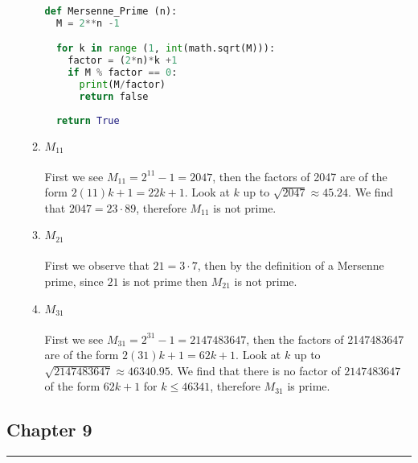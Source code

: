 \documentclass[class=article, crop=false]{standalone}
\begin{document}
\begin{enumerate}
\begin{enumerate}
\begin{center}
\begin{lstlisting}[language=Python]
def Mersenne_Prime (n):
  M = 2**n -1

  for k in range (1, int(math.sqrt(M))):
	factor = (2*n)*k +1
	if M % factor == 0:
	  print(M/factor)
	  return false
  
  return True
\end{lstlisting}
\end{center}


  \item
	$M_{11}$ \\\\
	First we see $M_{11} = 2^{11} - 1= 2047$, then the factors of 2047 are of the form
	$2(11)k+1 = 22k + 1$. Look at $k$ up to $\sqrt{2047}\approx 45.24$. We find that
	$2047 = 23\cdot 89$, therefore $M_{11}$ is not prime.
  \item
	$M_{21}$ \\\\
	First we observe that $21=3\cdot 7$, then by the definition of a Mersenne prime, since $21$ is
	not prime then $M_{21}$ is not prime.
  \item
	$M_{31}$ \\\\
	First we see $M_{31} = 2^{31} -1=2147483647$, then the factors of 2147483647 are of the form
	$2(31)k+1 = 62k+1$. Look at $k$ up to $\sqrt{2147483647} \approx 46340.95$. We find that
	there is no factor of $2147483647$ of the form $62k+1$ for $k\leq 46341$, therefore $M_{31}$ is prime.
  \end{enumerate}

\end{enumerate}

\setcounter{subsection}{8}
\subsection{Chapter 9}
\rule{\textwidth}{1pt}\\
\end{document}
